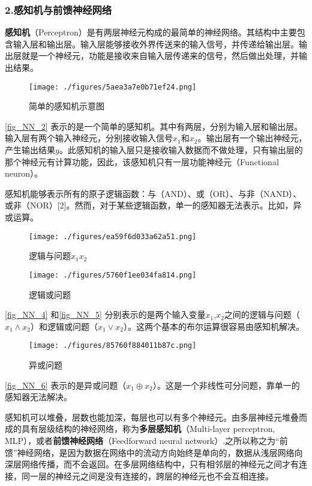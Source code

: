 \subsubsection{2.感知机与前馈神经网络}
\textbf{感知机}（Perceptron）是有两层神经元构成的最简单的神经网络。其结构中主要包含输入层和输出层。输入层能够接收外界传送来的输入信号，并传递给输出层。输出层就是一个神经元，功能是接收来自输入层传递来的信号，然后做出处理，并输出结果。
\begin{figure}[ht]
\centering
\texttt{[image: ./figures/5aea3a7e0b71ef24.png]}
\caption{简单的感知机示意图} \label{fig_NN_2}
\end{figure}
\autoref{fig_NN_2} 表示的是一个简单的感知机。其中有两层，分别为输入层和输出层。输入层有两个输入神经元，分别接收输入信号$x_1$和$x_2$。输出层有一个输出神经元，产生输出结果$y$。此感知机的输入层只是接收输入数据而不做处理，只有输出层的那个神经元有计算功能，因此，该感知机只有一层功能神经元（Functional neuron）。

感知机能够表示所有的原子逻辑函数：与（AND）、或（OR）、与非（NAND）、或非（NOR）[2]。然而，对于某些逻辑函数，单一的感知器无法表示。比如，异或运算。

\begin{figure}[ht]
\centering
\texttt{[image: ./figures/ea59f6d033a62a51.png]}
\caption{逻辑与问题$x_1x_2$} \label{fig_NN_4}
\end{figure}

\begin{figure}[ht]
\centering
\texttt{[image: ./figures/5760f1ee034fa814.png]}
\caption{逻辑或问题} \label{fig_NN_5}
\end{figure}

\autoref{fig_NN_4} 和\autoref{fig_NN_5} 分别表示的是两个输入变量$x_1$,$x_2$之间的逻辑与问题（$x_1 \wedge x_2$）和逻辑或问题（$x_1 \vee x_2$）。这两个基本的布尔运算很容易由感知机解决。

\begin{figure}[ht]
\centering
\texttt{[image: ./figures/85760f884011b87c.png]}
\caption{异或问题} \label{fig_NN_6}
\end{figure}
\autoref{fig_NN_6} 表示的是异或问题（$x_1 \oplus x_2$）。这是一个非线性可分问题，靠单一的感知器无法解决。

感知机可以堆叠，层数也能加深，每层也可以有多个神经元。由多层神经元堆叠而成的具有层级结构的神经网络，称为\textbf{多层感知机}（Multi-layer perceptron, MLP），或者\textbf{前馈神经网络}（Feedforward neural network）.之所以称之为“前馈”神经网络，是因为数据在网络中的流动方向始终是单向的，数据从浅层网络向深层网络传播，而不会返回。在多层网络结构中，只有相邻层的神经元之间才有连接，同一层的神经元之间是没有连接的，跨层的神经元也不会互相连接。

